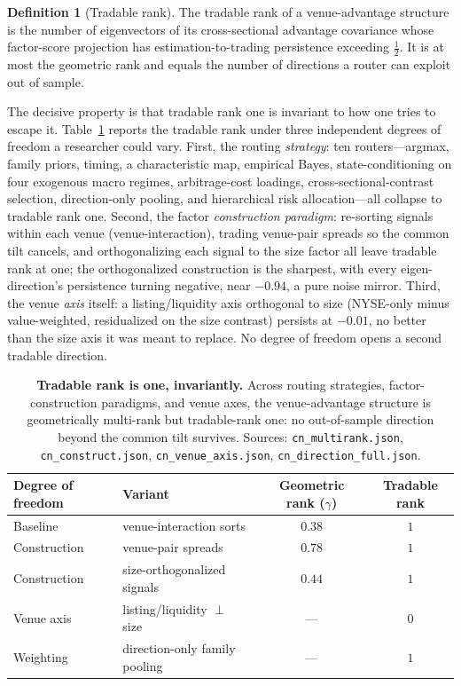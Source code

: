 \documentclass[12pt]{article}
\theoremstyle{plain}
\theoremstyle{definition}
\newtheorem{definition}{Definition}
\begin{document}
\begin{definition}[Tradable rank]
The tradable rank of a venue-advantage structure is the number of eigenvectors of
its cross-sectional advantage covariance whose factor-score projection has
estimation-to-trading persistence exceeding $\tfrac12$. It is at most the
geometric rank and equals the number of directions a router can exploit out of
sample.
\end{definition}

The decisive property is that tradable rank one is invariant to how one tries to
escape it. Table~\ref{tab:rank} reports the tradable rank under three independent
degrees of freedom a researcher could vary. First, the routing \emph{strategy}:
ten routers---argmax, family priors, timing, a characteristic map, empirical
Bayes, state-conditioning on four exogenous macro regimes, arbitrage-cost
loadings, cross-sectional-contrast selection, direction-only pooling, and
hierarchical risk allocation---all collapse to tradable rank one. Second, the
factor \emph{construction paradigm}: re-sorting signals within each venue
(venue-interaction), trading venue-pair spreads so the common tilt cancels, and
orthogonalizing each signal to the size factor all leave tradable rank at one;
the orthogonalized construction is the sharpest, with every eigen-direction's
persistence turning negative, near $-0.94$, a pure noise mirror. Third, the venue
\emph{axis} itself: a listing/liquidity axis orthogonal to size (NYSE-only minus
value-weighted, residualized on the size contrast) persists at $-0.01$, no better
than the size axis it was meant to replace. No degree of freedom opens a second
tradable direction.

\begin{table}[t]
\centering
\caption{\textbf{Tradable rank is one, invariantly.} Across routing strategies,
factor-construction paradigms, and venue axes, the venue-advantage structure is
geometrically multi-rank but tradable-rank one: no out-of-sample direction beyond
the common tilt survives. Sources: \texttt{cn\_multirank.json},
\texttt{cn\_construct.json}, \texttt{cn\_venue\_axis.json},
\texttt{cn\_direction\_full.json}.}
\label{tab:rank}
\small
\begin{tabular}{llcc}
\toprule
Degree of freedom & Variant & Geometric rank ($\gamma$) & Tradable rank \\
\midrule
Baseline & venue-interaction sorts & $0.38$ & $1$ \\
Construction & venue-pair spreads & $0.78$ & $1$ \\
Construction & size-orthogonalized signals & $0.44$ & $1$ \\
Venue axis & listing/liquidity $\perp$ size & --- & $0$ \\
Weighting & direction-only family pooling & --- & $1$ \\
\bottomrule
\end{tabular}
\end{table}
\end{document}
